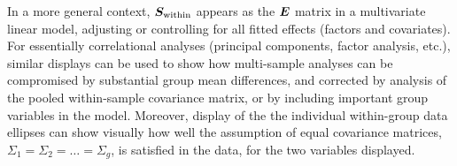 In a more general context, $ \bm{S}_{\textrm{within}}$
appears as the $\bm{E}$ matrix in a multivariate
linear model, adjusting or controlling for all fitted effects (factors and covariates).
For essentially correlational analyses (principal components,
factor analysis, etc.),
similar displays can be used to show how multi-sample analyses
can be compromised by substantial group mean differences, and corrected
by analysis of the pooled within-sample covariance matrix, or by
including important group variables in the model.
Moreover, display of the the individual within-group data ellipses can
show visually how well the assumption of
equal covariance matrices,
$\Sigma_1 = \Sigma_2 = \dots = \Sigma_g$,
is satisfied in the data, for the two variables
displayed.


